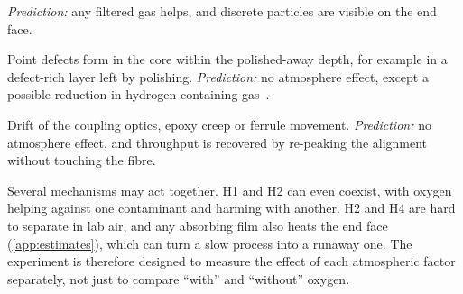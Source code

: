 \begin{description}[leftmargin=2.6em,style=nextline,itemsep=3pt]
        \emph{Prediction:} any filtered gas helps, and discrete particles are visible on the end face.
  \item[H5 -- colour centres in the glass] Point defects form in the core within the polished-away
        depth, for example in a defect-rich layer left by polishing. \emph{Prediction:} no atmosphere
        effect, except a possible reduction in hydrogen-containing gas~\cite{Colombe2014}.
  \item[H6 -- mechanical or thermal artefact] Drift of the coupling optics, epoxy creep or ferrule movement.
        \emph{Prediction:} no atmosphere effect, and throughput is recovered by re-peaking the alignment without
        touching the fibre.
\end{description}
Several mechanisms may act together. H1 and H2 can even coexist, with oxygen helping against one
contaminant and harming with another. H2 and H4 are hard to separate in lab air, and any absorbing film
also heats the end face (\cref{app:estimates}), which can turn a slow process into a runaway one. The
experiment is therefore designed to measure the effect of each atmospheric factor separately, not just
to compare ``with'' and ``without'' oxygen.

